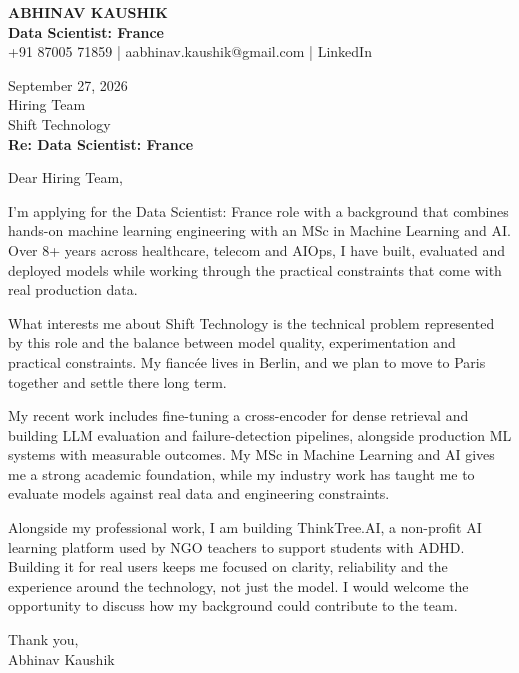 \documentclass[10pt,a4paper]{article}
\begin{document}
\begin{center}
{\Large\bfseries ABHINAV KAUSHIK}\\[2pt]
{\bfseries Data Scientist: France}\\[2pt]
+91 87005 71859 \quad | \quad aabhinav.kaushik@gmail.com \quad | \quad LinkedIn
\end{center}
\vspace{8pt}
September 27, 2026\\[6pt]
Hiring Team\\
Shift Technology\\[4pt]
\textbf{Re: Data Scientist: France}

Dear Hiring Team,

I’m applying for the Data Scientist: France role with a background that combines hands-on machine learning engineering with an MSc in Machine Learning and AI. Over 8+ years across healthcare, telecom and AIOps, I have built, evaluated and deployed models while working through the practical constraints that come with real production data.

What interests me about Shift Technology is the technical problem represented by this role and the balance between model quality, experimentation and practical constraints. My fiancée lives in Berlin, and we plan to move to Paris together and settle there long term.

My recent work includes fine-tuning a cross-encoder for dense retrieval and building LLM evaluation and failure-detection pipelines, alongside production ML systems with measurable outcomes. My MSc in Machine Learning and AI gives me a strong academic foundation, while my industry work has taught me to evaluate models against real data and engineering constraints.

Alongside my professional work, I am building ThinkTree.AI, a non-profit AI learning platform used by NGO teachers to support students with ADHD. Building it for real users keeps me focused on clarity, reliability and the experience around the technology, not just the model. I would welcome the opportunity to discuss how my background could contribute to the team.

Thank you,\\
Abhinav Kaushik
\end{document}
